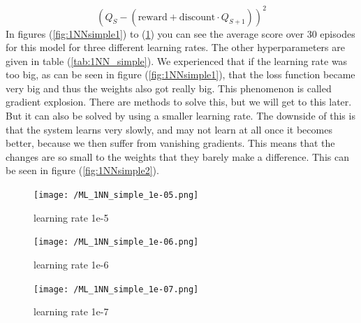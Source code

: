 \documentclass{report}
\begin{document}
\begin{equation}
    \label{eq:loss1}
    \left( Q_{S} - \left(\text{reward} + \text{discount}\cdot Q_{S+1} \right) \right)^2
\end{equation}
In figures (\ref{fig:1NNsimple1}) to (\ref{fig:1NNsimple3}) you can see the average score over 30 episodes for this model for three different learning rates. The other hyperparameters are given in table (\ref{tab:1NN_simple}). We experienced that if the learning rate was too big, as can be seen in figure (\ref{fig:1NNsimple1}), that the loss function became very big and thus the weights also got really big. This phenomenon is called gradient explosion. There are methods to solve this, but we will get to this later. But it can also be solved by using a smaller learning rate. The downside of this is that the system learns very slowly, and may not learn at all once it becomes better, because we then suffer from vanishing gradients. This means that the changes are so small to the weights that they barely make a difference. This can be seen in figure (\ref{fig:1NNsimple2}).
\begin{figure}[h]
	\centering
	\begin{minipage}[b]{0.32\textwidth}
   		\texttt{[image: /ML\_1NN\_simple\_1e-05.png]}
    	\caption{learning rate 1e-5}
    	\label{fig:1NNsimple1}
 	\end{minipage}
  	\begin{minipage}[b]{0.32\textwidth}
    	\texttt{[image: /ML\_1NN\_simple\_1e-06.png]}
    	\caption{learning rate 1e-6}
    	\label{fig:1NNsimple2}
 	\end{minipage}
 	\begin{minipage}[b]{0.32\textwidth}
    	\texttt{[image: /ML\_1NN\_simple\_1e-07.png]}
    	\caption{learning rate 1e-7}
    	\label{fig:1NNsimple3}
 	\end{minipage}
\end{figure}
\end{document}

